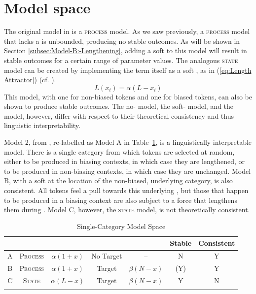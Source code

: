 \section{\label{sec:Model-Interpretation}Model space}

The original  model in 
is a \textsc{process} model. As we saw previously, a \textsc{process}
model that lacks a   is unbounded, producing no stable
outcomes. As will be shown in Section \ref{subsec:Model-B:-Lengthening},
adding a soft  to this model will result in stable outcomes
for a certain range of parameter values. The analogous \textsc{state}
model can be created by implementing the  term itself as a soft
, as in (\ref{eq:Length Attractor}) (cf. \citealt{soskuthy2013phonetic}). 
\begin{equation}
L(x_{i})=\alpha(L-x_{i})\label{eq:Length Attractor}
\end{equation}
This model, with one  for non-biased tokens and one for biased
tokens, can also be shown to produce stable outcomes. The no-
 model, the soft-  model, and the
 model, however, differ with respect to their theoretical
consistency and thus linguistic interpretability. 

Model 2, from , re-labelled
as Model A in Table~\ref{tab: Model Comparison-1}, is a linguistically
interpretable model. There is a single category from which tokens
are selected at random, either to be produced in biasing contexts,
in which case they are lengthened, or to be produced in non-biasing
contexts, in which case they are unchanged. Model B, with a soft 
at the location of the non-biased, underlying category, is also consistent.
All tokens feel a pull towards this underlying , but those that
happen to be produced in a biasing context are also subject to a force
that lengthens them during . Model C, however, the \textsc{state}
model, is not theoretically consistent. 

\begin{table}[h]\footnotesize
\caption{Single-Category Model Space\label{tab: Model Comparison-1}}
\begin{tabular}{ccccccc}
\lsptoprule
 & \multicolumn{2}{c}{} & \multicolumn{2}{c}{} & Stable & Consistent\tabularnewline
\midrule
A & \textsc{Process} & $\alpha(1+x)$ & No Target & – & N & Y\tabularnewline
B & \textsc{Process} & $\alpha(1+x)$ & Target & $\beta(N-x)$ & (Y) & Y\tabularnewline
C & \textsc{State} & $\alpha(L-x)$ & Target & $\beta(N-x)$ & Y & N\tabularnewline
\lspbottomrule
\end{tabular}
\end{table}

